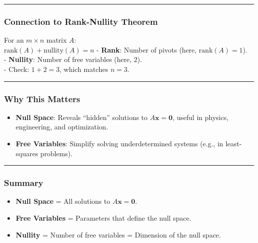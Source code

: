 \documentclass[11pt]{article}
\makeatletter
\providecommand{\tightlist}{%
      \setlength{\itemsep}{0pt}\setlength{\parskip}{0pt}}
\newcommand{\boxspacing}{\kern\kvtcb@left@rule\kern\kvtcb@boxsep}
\newcommand{\prompt}[4]{
        {\ttfamily\llap{{\color{#2}[#3]:\hspace{3pt}#4}}\vspace{-\baselineskip}}
    }
\makeatother
\begin{document}
\begin{center}\rule{0.5\linewidth}{0.5pt}\end{center}

\subsubsection{\texorpdfstring{\textbf{Connection to Rank-Nullity
Theorem}}{Connection to Rank-Nullity Theorem}}\label{connection-to-rank-nullity-theorem}

For an \(m \times n\) matrix \(A\):\\
\(\text{rank}(A) + \text{nullity}(A) = n\) - \textbf{Rank}: Number of
pivots (here, \(\text{rank}(A) = 1\)).\\
- \textbf{Nullity}: Number of free variables (here, \(2\)).\\
- Check: \(1 + 2 = 3\), which matches \(n = 3\).

\begin{center}\rule{0.5\linewidth}{0.5pt}\end{center}

\subsubsection{\texorpdfstring{\textbf{Why This
Matters}}{Why This Matters}}\label{why-this-matters}

\begin{itemize}
\tightlist
\item
  \textbf{Null Space}: Reveals ``hidden'' solutions to
  \(A\mathbf{x} = \mathbf{0}\), useful in physics, engineering, and
  optimization.\\
\item
  \textbf{Free Variables}: Simplify solving underdetermined systems
  (e.g., in least-squares problems).
\end{itemize}

\begin{center}\rule{0.5\linewidth}{0.5pt}\end{center}

\subsubsection{\texorpdfstring{\textbf{Summary}}{Summary}}\label{summary}

\begin{itemize}
\tightlist
\item
  \textbf{Null Space} = All solutions to \(A\mathbf{x} = \mathbf{0}\).\\
\item
  \textbf{Free Variables} = Parameters that define the null space.\\
\item
  \textbf{Nullity} = Number of free variables = Dimension of the null
  space.
\end{itemize}

    \begin{tcolorbox}[breakable, size=fbox, boxrule=1pt, pad at break*=1mm,colback=cellbackground, colframe=cellborder]
\prompt{In}{incolor}{ }{\boxspacing}
\begin{Verbatim}[commandchars=\\\{\}]

\end{Verbatim}
\end{tcolorbox}


    
    
    
\end{document}
